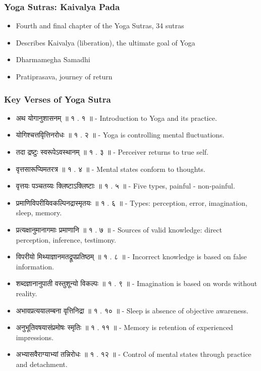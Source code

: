 \begin{frame}[fragile]\frametitle{Yoga Sutras: Kaivalya Pada}
    \begin{itemize}
        \item Fourth and final chapter of the Yoga Sutras, 34 sutras
        \item Describes Kaivalya (liberation), the ultimate goal of Yoga
        \item Dharmamegha Samadhi
		\item Pratiprasava, journey of return
    \end{itemize}
\end{frame}
\begin{frame}[fragile]\frametitle{Key Verses of Yoga Sutra}

    \begin{itemize}
        \item अथ योगानुशासनम् ॥ १ . १ ॥ - Introduction to Yoga and its practice.
        \item योगिश्चत्तवृित्तिनरोधः ॥ १ . २ ॥ - Yoga is controlling mental fluctuations.
        \item तदा द्रष्टुः स्वरूपेऽवस्थानम् ॥ १ . ३ ॥ - Perceiver returns to true self.
        \item वृत्तसारूप्यिमतरत्र ॥ १ . ४ ॥ - Mental states conform to thoughts.
        \item वृत्तयः पञ्चतय्यः क्लिष्टाऽक्लिष्टाः ॥ १ . ५ ॥ - Five types,  painful - non-painful.
        \item प्रमाणिविपरीयिवकल्पिनद्रास्मृतयः ॥ १ . ६ ॥ - Types: perception, error, imagination, sleep, memory.
        \item प्रत्यक्षानुमानागमाः प्रमाणानि ॥ १ . ७ ॥ - Sources of valid knowledge: direct perception, inference, testimony.
        \item विपरीयो मिथ्याज्ञानमतद्रूपप्रतिष्ठम् ॥ १ . ८ ॥ - Incorrect knowledge is based on false information.
        \item शब्दज्ञानानुपाती वस्तुशून्यो विकल्पः ॥ १ . ९ ॥ - Imagination is based on words without reality.
        \item अभावप्रत्ययालम्बना वृत्तिनिद्रा ॥ १ . १० ॥ - Sleep is absence of objective awareness.
        \item अनुभूतिवषयासंप्रमोषः स्मृतिः ॥ १ . ११ ॥ - Memory is retention of experienced impressions.
        \item अभ्यासवैराग्याभ्यां तन्निरोधः ॥ १ . १२ ॥ - Control of mental states through practice and detachment.
    \end{itemize}

\end{frame}

